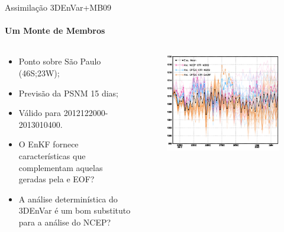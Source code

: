\documentclass[10pt,aspectratio=169]{beamer}
\begin{document}
\begin{frame}{Assimilação 3DEnVar+MB09}
\framesubtitle{Um Monte de Membros}
	\begin{columns}[t]
    	\begin{column}{.5\textwidth}
    		\begin{itemize}
        		\item Ponto sobre São Paulo (46S;23W);
        		\item Previsão da PSNM 15 dias;
        		\item Válido para 2012122000-2013010400.
    		\end{itemize}
    		\vspace{1em}
    		\begin{itemize}
				\item O EnKF fornece características que complementam aquelas geradas pela e EOF? 
				\item A análise determinística do 3DEnVar é um bom substituto para a análise do NCEP?
			\end{itemize}
        \end{column}
        \begin{column}{.5\textwidth}
            \vspace{-3em}
			\begin{figure}[t]
			  \centering
			  \includegraphics[width=1.\linewidth]{./figs/spaguete71.png}
			\end{figure}
        \end{column}
    \end{columns}
\end{frame}
\end{document}
